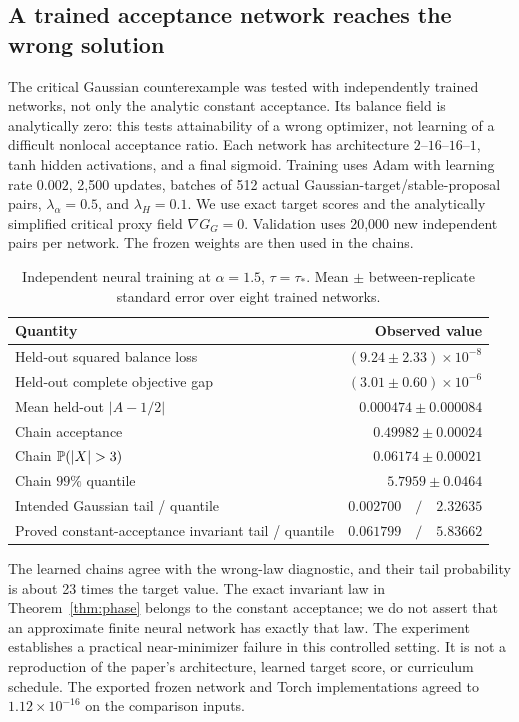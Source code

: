 \documentclass[pdflatex,iicol,sn-mathphys-ay]{sn-jnl}
\theoremstyle{definition}\newtheorem{definition}[theorem]{Definition}
\theoremstyle{remark}\newtheorem{remark}[theorem]{Remark}
\numberwithin{equation}{section}
\newcommand{\1}{\mathbf 1}
\begin{document}
\subsection{A trained acceptance network reaches the wrong solution}
The critical Gaussian counterexample was tested with independently trained networks, not only the analytic constant acceptance. Its balance field is analytically zero: this tests attainability of a wrong optimizer, not learning of a difficult nonlocal acceptance ratio. Each network has architecture $2$--$16$--$16$--$1$, tanh hidden activations, and a final sigmoid. Training uses Adam with learning rate $0.002$, 2,500 updates, batches of 512 actual Gaussian-target/stable-proposal pairs, $\lambda_\alpha=0.5$, and $\lambda_H=0.1$. We use exact target scores and the analytically simplified critical proxy field $\nabla G_G=0$. Validation uses 20,000 new independent pairs per network. The frozen weights are then used in the chains.

\begin{table}[t]\centering
\caption{Independent neural training at $\alpha=1.5$, $\tau=\tau_*$. Mean $\pm$ between-replicate standard error over eight trained networks.}
\begin{tabular}{@{}lr@{}}\toprule
Quantity & Observed value\\\midrule
Held-out squared balance loss &$ (9.24\pm2.33)\times10^{-8}$\\
Held-out complete objective gap &$ (3.01\pm0.60)\times10^{-6}$\\
Mean held-out $|A-1/2|$ &$0.000474\pm0.000084$\\
Chain acceptance &$0.49982\pm0.00024$\\
Chain $\Prob(|X|>3)$ &$0.06174\pm0.00021$\\
Chain $99\%$ quantile &$5.7959\pm0.0464$\\\midrule
Intended Gaussian tail / quantile &$0.002700\quad/\quad2.32635$\\
Proved constant-acceptance invariant tail / quantile &$0.061799\quad/\quad5.83662$\\\bottomrule
\end{tabular}\label{tab:neural}
\end{table}
The learned chains agree with the wrong-law diagnostic, and their tail probability is about 23 times the target value. The exact invariant law in Theorem~\ref{thm:phase} belongs to the constant acceptance; we do not assert that an approximate finite neural network has exactly that law. The experiment establishes a practical near-minimizer failure in this controlled setting. It is not a reproduction of the paper's architecture, learned target score, or curriculum schedule. The exported frozen network and Torch implementations agreed to $1.12\times10^{-16}$ on the comparison inputs.
\end{document}
